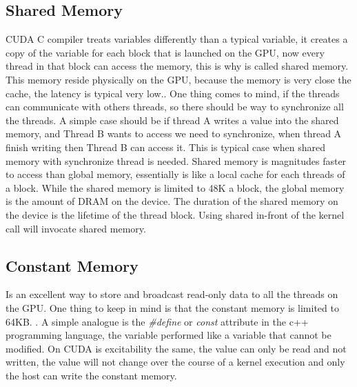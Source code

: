 

\subsection{Shared Memory}

CUDA C compiler treats variables differently than a typical variable, it creates a copy of the variable for each block that is launched on the GPU, now every thread in that block can access the memory, this is why is called shared memory. This memory reside physically on the GPU, because the memory is very close the cache, the latency is typical very low.\cite{example}. One thing comes to mind, if the threads can communicate with others threads, so there should be way to synchronize all the threads. A simple case should be if thread A writes a value into the shared memory, and Thread B wants to access we need to synchronize, when thread A finish writing then Thread B can access it. This is typical case when shared memory with synchronize thread is needed. \cite{cook}
Shared memory is magnitudes faster to access than global memory, essentially is like a local cache for each threads of a block. While  the shared memory is limited to 48K a block, the global memory is the amount of DRAM on the device. The duration of the shared memory on the device is the lifetime of the thread block. Using \twoline shared \twoline in-front of the kernel call will invocate shared memory.


\subsection{Constant Memory}

Is an excellent way to store and broadcast read-only data to all the threads on the GPU. One thing to keep in mind is that the constant memory is limited to 64KB. \cite{design}. A simple analogue is the  \textit{\#define} or \textit{const} attribute in the c++ programming language, the variable performed like a variable that cannot be modified. On CUDA is  excitability the same, the value can only be read and not written, the value will not change over the course of a kernel execution and only the host can write the constant memory.\cite{example}

